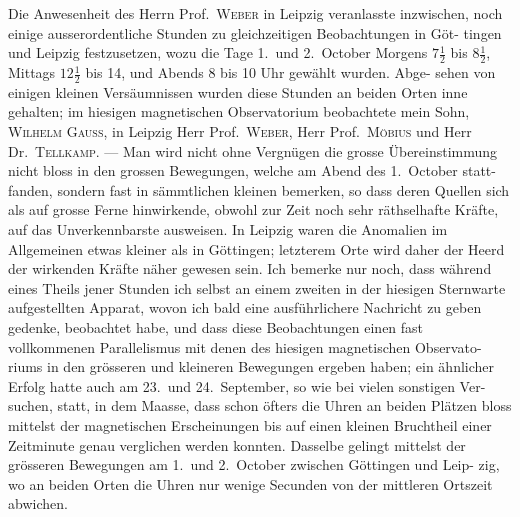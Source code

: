 \documentclass[12pt,a4paper]{article}
\begin{document}
Die Anwesenheit des Herrn Prof.\ \textsc{Weber} in Leipzig veranlasste inzwischen, 
noch einige ausserordentliche Stunden zu gleichzeitigen Beobachtungen in Göt-
tingen und Leipzig festzusetzen, wozu die Tage 1.\ und 2.\ October Morgens $7\tfrac{1}{2}$ 
bis $8\tfrac{1}{2}$, Mittags $12\tfrac{1}{2}$ bis 14, und Abends 8 bis 10 Uhr gewählt wurden. Abge-
sehen von einigen kleinen Versäumnissen wurden diese Stunden an beiden Orten 
inne gehalten; im hiesigen magnetischen Observatorium beobachtete mein Sohn, 
\textsc{Wilhelm Gauss}, in Leipzig Herr Prof.\ \textsc{Weber}, Herr Prof.\ \textsc{Möbius} und Herr Dr.\ 
\textsc{Tellkamp}. --- Man wird nicht ohne Vergnügen die grosse Übereinstimmung 
nicht bloss in den grossen Bewegungen, welche am Abend des 1.\ October statt-
fanden, sondern fast in sämmtlichen kleinen bemerken, so dass deren Quellen 
sich als auf grosse Ferne hinwirkende, obwohl zur Zeit noch sehr räthselhafte 
Kräfte, auf das Unverkennbarste ausweisen. In Leipzig waren die Anomalien 
im Allgemeinen etwas kleiner als in Göttingen; letzterem Orte wird daher der 
Heerd der wirkenden Kräfte näher gewesen sein. Ich bemerke nur noch, dass 
während eines Theils jener Stunden ich selbst an einem zweiten in der hiesigen 
Sternwarte aufgestellten Apparat, wovon ich bald eine ausführlichere Nachricht 
zu geben gedenke, beobachtet habe, und dass diese Beobachtungen einen fast 
vollkommenen Parallelismus mit denen des hiesigen magnetischen Observato-
riums in den grösseren und kleineren Bewegungen ergeben haben; ein ähnlicher 
Erfolg hatte auch am 23.\ und 24.\ September, so wie bei vielen sonstigen Ver-
suchen, statt, in dem Maasse, dass schon öfters die Uhren an beiden Plätzen 
bloss mittelst der magnetischen Erscheinungen bis auf einen kleinen Bruchtheil 
einer Zeitminute genau verglichen werden konnten. Dasselbe gelingt mittelst 
der grösseren Bewegungen am 1.\ und 2.\ October zwischen Göttingen und Leip-
zig, wo an beiden Orten die Uhren nur wenige Secunden von der mittleren 
Ortszeit abwichen.
\end{document}
